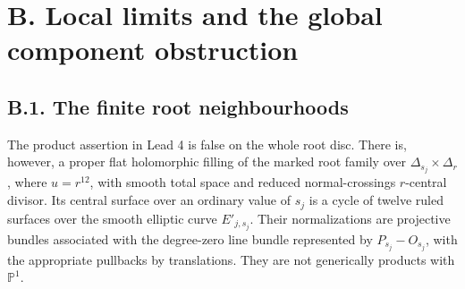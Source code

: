 \section{B. Local limits and the global component obstruction}
\subsection{B.1. The finite root neighbourhoods}

\begin{proposition}\label{push:src:B.1.1}\label{push:B11}
The product assertion in Lead 4 is false on the whole root
disc. There is, however, a proper flat holomorphic filling of
the marked root family over
$\Delta_{s_j}\times\Delta_r$, where $u=r^{12}$, with smooth
total space and reduced normal-crossings $r$-central divisor.
Its central surface over an ordinary value of $s_j$ is a cycle
of twelve ruled surfaces over the smooth elliptic curve
$E'_{j,s_j}$. Their normalizations are projective bundles
associated with the degree-zero line bundle represented by
$P_{s_j}-O_{s_j}$, with the appropriate pullbacks by translations.
They are not generically products with $\mathbb P^1$.
\end{proposition}
